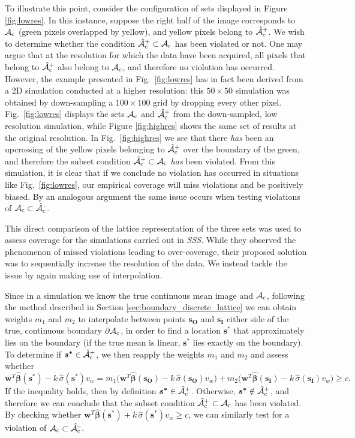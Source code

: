 To illustrate this point, consider the configuration of sets displayed in Figure \ref{fig:lowres}. In this instance, suppose the right half of the image corresponds to $\operatorname{\mathcal{A}_{c}}$ (green pixels overlapped by yellow), and yellow pixels belong to $\operatorname{\hat{\mathcal{A}}_{c}^+}$. We wish to determine whether the condition $\operatorname{\hat{\mathcal{A}}_{c}^+} \subset \operatorname{\mathcal{A}_{c}}$ has been violated or not. One may argue that at the resolution for which the data have been acquired, all pixels that belong to $\operatorname{\hat{\mathcal{A}}_{c}^+}$ also belong to $\operatorname{\mathcal{A}_{c}}$, and therefore no violation has  occurred. However, the example presented in Fig.\ \ref{fig:lowres} has in fact been derived from a 2D simulation conducted at a higher resolution: this $50 \times 50$ simulation was obtained by down-sampling a $100 \times 100$ grid by dropping every other pixel. 
Fig.\ \ref{fig:lowres} displays the sets $\operatorname{\mathcal{A}_{c}}$ and $\operatorname{\hat{\mathcal{A}}_{c}^+}$ from the down-sampled, low resolution simulation, while Figure \ref{fig:highres} shows the same set of results at the original resolution. In Fig.\ \ref{fig:highres} we see that there \textit{has} been an upcrossing of the yellow pixels belonging to $\operatorname{\hat{\mathcal{A}}_{c}^+}$ over the boundary of the green, and therefore the subset condition $\operatorname{\hat{\mathcal{A}}_{c}^+} \subset \operatorname{\mathcal{A}_{c}}$ \textit{has} been violated. From this simulation, it is clear that if we conclude no violation has occurred in situations like Fig.\ \ref{fig:lowres}, our empirical coverage will miss violations and be positively biased. By an analogous argument the same issue occurs when testing violations of $\operatorname{\mathcal{A}_{c}} \subset \operatorname{\hat{\mathcal{A}}_{c}^{\textrm{--}}}$.

This direct comparison of the lattice representation of the three sets was used to assess coverage for the simulations carried out in \textit{SSS}. While  they observed the phenomenon of missed violations leading to over-coverage, their proposed solution was to sequentially increase the resolution of the data. We instead tackle the issue by again making use of interpolation.

Since in a simulation we know the true continuous mean image and $\operatorname{\mathcal{A}_{c}}$, following the method described in Section \ref{sec:boundary_discrete_lattice} we can obtain weights $m_1$ and $m_2$ to interpolate between points $\bm{s_O}$ and $\bm{s_I}$ either side of the true, continuous boundary $\operatorname{\partial\mathcal{A}_{c}}$, in order to find a location $\bm{s^*}$ that approximately lies on the boundary (if the true mean is linear, $\bm{s^*}$ lies exactly on the boundary). To determine if $\bm{s^*} \in \operatorname{\hat{\mathcal{A}}_{c}^+}$, we then reapply the weights $m_1$ and $m_2$ and assess whether
\begin{equation}
\label{eq:interpolation_in_action}
\bm{w}^{T}\bm{\hat{\beta}}(\bm{s^{*}}) - k\, \hat{\sigma}(\bm{s^{*}}) v_{w} = m_1 \Bigg( \bm{w}^{T}\bm{\hat{\beta}}(\bm{s_O}) - k\, \hat{\sigma}(\bm{s_O}) v_{w} \Bigg) + m_2 \Bigg( \bm{w}^{T}\bm{\hat{\beta}}(\bm{s_I}) - k\, \hat{\sigma}(\bm{s_I}) v_{w} \Bigg) \geq c.
\end{equation}
 If the inequality holds, then by definition $\bm{s^{*}} \in \operatorname{\hat{\mathcal{A}}_{c}^+}$. Otherwise, $\bm{s^{*}} \notin \operatorname{\hat{\mathcal{A}}_{c}^+}$, and therefore we can conclude that the subset condition $\operatorname{\hat{\mathcal{A}}_{c}^+} \subset \operatorname{\mathcal{A}_{c}}$ has been violated. By checking whether $\bm{w}^{T}\bm{\hat{\beta}}(\bm{s^{*}}) + k\, \hat{\sigma}(\bm{s^{*}}) v_{w} \geq c$, we can similarly test for a violation of $\operatorname{\mathcal{A}_{c}} \subset \operatorname{\hat{\mathcal{A}}_{c}^{\textrm{--}}}$.
 
